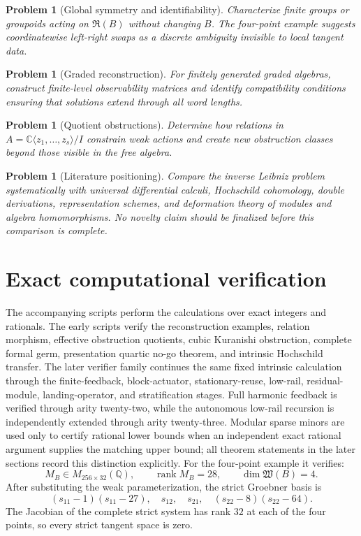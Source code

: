 \documentclass[11pt]{amsart}
\newtheorem{problem}[theorem]{Problem}
\newcommand{\rank}{\operatorname{rank}}
\newcommand{\Wfib}{\mathfrak W}
\newcommand{\Rfib}{\mathfrak R}
\newcommand{\C}{\mathbb C}
\begin{document}
\begin{problem}[Global symmetry and identifiability]
Characterize finite groups or groupoids acting on $\Rfib(B)$ without changing $B$.  The four-point example suggests coordinatewise left-right swaps as a discrete ambiguity invisible to local tangent data.
\end{problem}

\begin{problem}[Graded reconstruction]
For finitely generated graded algebras, construct finite-level observability matrices and identify compatibility conditions ensuring that solutions extend through all word lengths.
\end{problem}

\begin{problem}[Quotient obstructions]
Determine how relations in $A=\C\langle z_1,\ldots,z_s\rangle/I$ constrain weak actions and create new obstruction classes beyond those visible in the free algebra.
\end{problem}

\begin{problem}[Literature positioning]
Compare the inverse Leibniz problem systematically with universal differential calculi, Hochschild cohomology, double derivations, representation schemes, and deformation theory of modules and algebra homomorphisms.  No novelty claim should be finalized before this comparison is complete.
\end{problem}

\appendix

\section{Exact computational verification}

The accompanying scripts perform the calculations over exact integers and rationals.  The early scripts verify the reconstruction examples, relation morphism, effective obstruction quotients, cubic Kuranishi obstruction, complete formal germ, presentation quartic no-go theorem, and intrinsic Hochschild transfer.  The later verifier family continues the same fixed intrinsic calculation through the finite-feedback, block-actuator, stationary-reuse, low-rail, residual-module, landing-operator, and stratification stages.  Full harmonic feedback is verified through arity twenty-two, while the autonomous low-rail recursion is independently extended through arity twenty-three.  Modular sparse minors are used only to certify rational lower bounds when an independent exact rational argument supplies the matching upper bound; all theorem statements in the later sections record this distinction explicitly.  For the four-point example it verifies:
\[
M_B\in M_{256\times32}(\mathbb Q),
\qquad
\rank M_B=28,
\qquad
\dim\Wfib(B)=4.
\]
After substituting the weak parameterization, the strict Groebner basis is
\[
(s_{11}-1)(s_{11}-27),\quad s_{12},\quad s_{21},\quad(s_{22}-8)(s_{22}-64).
\]
The Jacobian of the complete strict system has rank $32$ at each of the four points, so every strict tangent space is zero.
\end{document}
